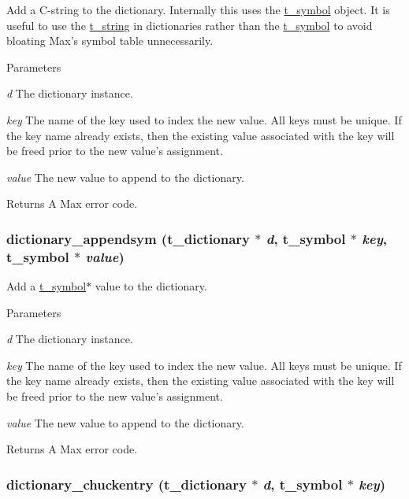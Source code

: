 Add a C-\/string to the dictionary. Internally this uses the \hyperlink{structt__symbol}{t\_\-symbol} object. It is useful to use the \hyperlink{structt__string}{t\_\-string} in dictionaries rather than the \hyperlink{structt__symbol}{t\_\-symbol} to avoid bloating Max's symbol table unnecessarily.


\begin{DoxyParams}{Parameters}
\item[{\em d}]The dictionary instance. \item[{\em key}]The name of the key used to index the new value. All keys must be unique. If the key name already exists, then the existing value associated with the key will be freed prior to the new value's assignment. \item[{\em value}]The new value to append to the dictionary. \end{DoxyParams}
\begin{DoxyReturn}{Returns}
A Max error code. 
\end{DoxyReturn}
\hypertarget{group__dictionary_ga5df20e3ac212f70d53469a3f091eae56}{
\subsubsection[{dictionary\_\-appendsym}]{ dictionary\_\-appendsym ({\bf t\_\-dictionary} $\ast$ {\em d}, \/  {\bf t\_\-symbol} $\ast$ {\em key}, \/  {\bf t\_\-symbol} $\ast$ {\em value})}}
\label{group__dictionary_ga5df20e3ac212f70d53469a3f091eae56}


Add a \hyperlink{structt__symbol}{t\_\-symbol}$\ast$ value to the dictionary. 
\begin{DoxyParams}{Parameters}
\item[{\em d}]The dictionary instance. \item[{\em key}]The name of the key used to index the new value. All keys must be unique. If the key name already exists, then the existing value associated with the key will be freed prior to the new value's assignment. \item[{\em value}]The new value to append to the dictionary. \end{DoxyParams}
\begin{DoxyReturn}{Returns}
A Max error code. 
\end{DoxyReturn}
\hypertarget{group__dictionary_gadac447ba3430cc2b8083d62df41932b8}{
\subsubsection[{dictionary\_\-chuckentry}]{ dictionary\_\-chuckentry ({\bf t\_\-dictionary} $\ast$ {\em d}, \/  {\bf t\_\-symbol} $\ast$ {\em key})}}
\label{group__dictionary_gadac447ba3430cc2b8083d62df41932b8}


